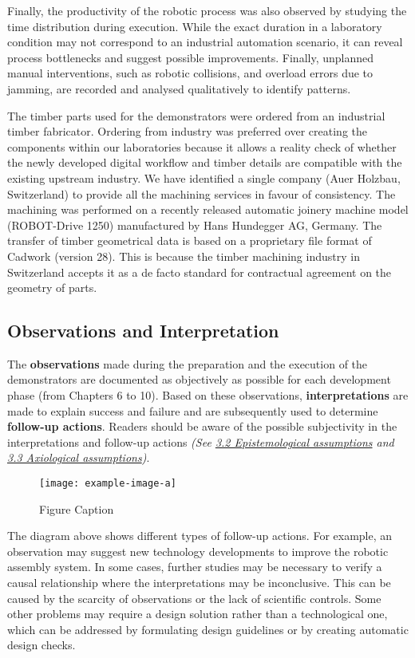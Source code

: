 Finally, the productivity of the robotic process was also observed by studying the time distribution during execution. While the exact duration in a laboratory condition may not correspond to an industrial automation scenario, it can reveal process bottlenecks and suggest possible improvements. Finally, unplanned manual interventions, such as robotic collisions, and overload errors due to jamming, are recorded and analysed qualitatively to identify patterns.

The timber parts used for the demonstrators were ordered from an industrial timber fabricator. Ordering from industry was preferred over creating the components within our laboratories because it allows a reality check of whether the newly developed digital workflow and timber details are compatible with the existing upstream industry. We have identified a single company (Auer Holzbau, Switzerland) to provide all the machining services in favour of consistency. The machining was performed on a recently released automatic joinery machine model (ROBOT-Drive 1250) manufactured by Hans Hundegger AG, Germany. The transfer of timber geometrical data is based on a proprietary file format of Cadwork (version 28). This is because the timber machining industry in Switzerland accepts it as a de facto standard for contractual agreement on the geometry of parts.

\subsection{Observations and Interpretation}

The \textbf{observations }made during the preparation and the execution of the demonstrators are documented as objectively as possible for each development phase (from Chapters 6 to 10). Based on these observations, \textbf{interpretations }are made to explain success and failure and are subsequently used to determine \textbf{follow-up actions}. Readers should be aware of the possible subjectivity in the interpretations and follow-up actions \textit{(See \ul{3.2 Epistemological assumptions} and \ul{3.3 Axiological assumptions})}. 

\begin{figure}
    \centering
    \texttt{[image: example-image-a]}
    \caption{Figure Caption}
\end{figure}

The diagram above shows different types of follow-up actions. For example, an observation may suggest new technology developments to improve the robotic assembly system. In some cases, further studies may be necessary to verify a causal relationship where the interpretations may be inconclusive. This can be caused by the scarcity of observations or the lack of scientific controls. Some other problems may require a design solution rather than a technological one, which can be addressed by formulating design guidelines or by creating automatic design checks. 

